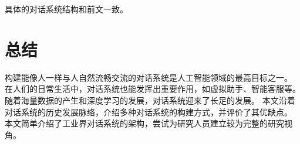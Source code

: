 \documentclass{clv3}
\begin{document}
具体的对话系统结构和前文一致。

\section{总结} %
构建能像人一样与人自然流畅交流的对话系统是人工智能领域的最高目标之一。
在人们的日常生活中，对话系统也能发挥出重要作用，如虚拟助手、智能客服等。
随着海量数据的产生和深度学习的发展，对话系统迎来了长足的发展。
本文沿着对话系统的历史发展脉络，介绍多种对话系统的构建方式，并评价了其优缺点。
本文简单介绍了工业界对话系统的架构，尝试为研究人员建立较为完整的研究视角。

\end{document}
